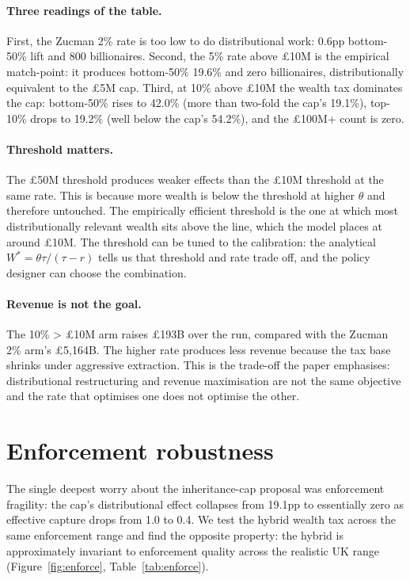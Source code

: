 \documentclass[11pt]{article}
\begin{document}
\paragraph{Three readings of the table.}  First, the Zucman 2\% rate
is too low to do distributional work: 0.6pp bottom-50\% lift and
800 billionaires.  Second, the 5\% rate above \pounds 10M is the
empirical match-point: it produces bottom-50\% 19.6\% and zero
billionaires, distributionally equivalent to the \pounds 5M cap.
Third, at 10\% above \pounds 10M the wealth tax dominates the
cap: bottom-50\% rises to 42.0\% (more than two-fold the cap's
19.1\%), top-10\% drops to 19.2\% (well below the cap's 54.2\%),
and the \pounds 100M+ count is zero.

\paragraph{Threshold matters.}  The \pounds 50M threshold produces
weaker effects than the \pounds 10M threshold at the same rate.
This is because more wealth is below the threshold at higher
$\theta$ and therefore untouched.  The empirically efficient
threshold is the one at which most distributionally relevant
wealth sits above the line, which the model places at around
\pounds 10M.  The threshold can be tuned to the calibration:
the analytical $W^* = \theta \tau / (\tau - r)$ tells us that
threshold and rate trade off, and the policy designer can choose
the combination.

\paragraph{Revenue is not the goal.}  The 10\% > \pounds 10M arm
raises \pounds 193B over the run, compared with the Zucman 2\%
arm's \pounds 5{,}164B.  The higher rate produces less revenue
because the tax base shrinks under aggressive extraction.  This
is the trade-off the paper emphasises: distributional restructuring
and revenue maximisation are not the same objective and the rate
that optimises one does not optimise the other.

\section{Enforcement robustness}
\label{sec:enforce}

The single deepest worry about the inheritance-cap proposal was
enforcement fragility: the cap's distributional effect collapses
from 19.1pp to essentially zero as effective capture drops from
1.0 to 0.4.  We test the hybrid wealth tax across the same
enforcement range and find the opposite property: the hybrid is
approximately invariant to enforcement quality across the
realistic UK range (Figure~\ref{fig:enforce},
Table~\ref{tab:enforce}).
\end{document}
